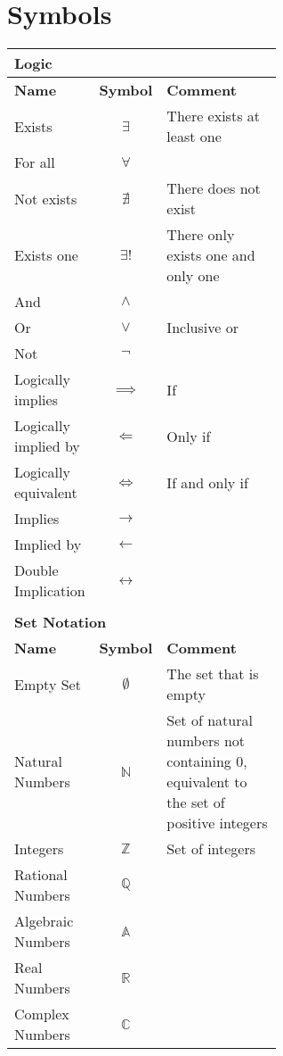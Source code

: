 \documentclass[12pt, english]{book}
\theoremstyle{break}
\theoremstyle{plain}
\begin{document}
	\section*{Symbols}
	\begin{tabularx}{\textwidth}{ l c p{0.6\linewidth}}
		\multicolumn{3}{l}{\textbf{{\large Logic}}} \\ [10pt]
		\hline
		\textbf{Name} & \textbf{Symbol} & \textbf{Comment} \\
		\hline
		Exists 					& $\exists$ 		& There exists at least one\\
		For all 				& $\forall$ 		& \\
		Not exists 				& $\nexists$ 		& There does not exist\\ 
		Exists one				& $\exists!$ 		& There only exists one and only one \\
		And 					& $\land$			& \\
		Or						& $\lor$			& Inclusive or \\
		Not 					& $\neg$			& \\
		Logically implies 		& $\implies$ 		& If \\
		Logically implied by 	& $\Longleftarrow$ 	& Only if \\  
		Logically equivalent 	& $\iff$ 			& If and only if \\
		Implies 				& $\longrightarrow$	& \\
		Implied by 				& $\longleftarrow$ 	& \\  
		Double Implication 		& $\longleftrightarrow$	& \\
		\hline	
		
		& & \\
		\multicolumn{3}{l}{\textbf{{\large Set Notation}}} \\ [10pt]
		\hline
		\textbf{Name} & \textbf{Symbol} & \textbf{Comment} \\
		\hline
 		Empty Set 				& $\emptyset$ 		& The set that is empty \\
 		Natural Numbers 		& $\mathbb{N}$		& Set of natural numbers not containing 0, equivalent to the set of positive integers \\
 		Integers 				& $\mathbb{Z}$		& Set of integers \\
 		Rational Numbers 		& $\mathbb{Q}$		& \\
 		Algebraic Numbers		& $\mathbb{A}$		& \\
 		Real Numbers 			& $\mathbb{R}$		& \\
 		Complex Numbers 		& $\mathbb{C}$		& \\
 		

\end{tabularx}
\end{document}
